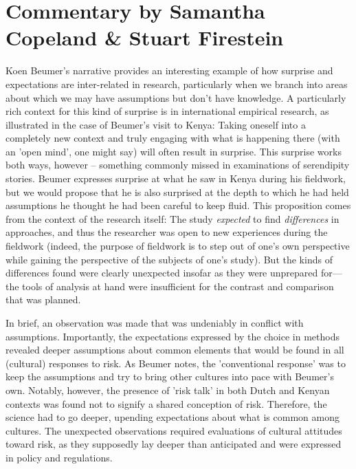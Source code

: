 \documentclass[authordate, empirical]{jote-new-article}
\author[1]{\mbox{Samantha Copeland\orcid{0000-0002-6946-7165}}}
\affil[1]{Delft University of Technology, Delft, the Netherlands}
\author[2]{\mbox{Stuart Firestein\orcid{0000-0003-1774-5853}}}
\affil[2]{Columbia University, New York, the United States}
\begin{document}
\begin{frontmatter}
  \maketitle
  \begin{abstract}
    \printabstracttext
  \end{abstract}
\end{frontmatter}


	\section{Commentary by Samantha Copeland \& Stuart Firestein}





	Koen Beumer's narrative provides an interesting example of how surprise and expectations are inter-related in research, particularly when we branch into areas about which we may have assumptions but don't have knowledge. A particularly rich context for this kind of surprise is in international empirical research, as illustrated in the case of Beumer's visit to Kenya: Taking oneself into a completely new context and truly engaging with what is happening there (with an 'open mind', one might say) will often result in surprise. This surprise works both ways, however -- something commonly missed in examinations of serendipity stories. Beumer expresses surprise at what he saw in Kenya during his fieldwork, but we would propose that he is also surprised at the depth to which he had held assumptions he thought he had been careful to keep fluid. This proposition comes from the context of the research itself: The study \emph{expected} to find \emph{differences} in approaches, and thus the researcher was open to new experiences during the fieldwork (indeed, the purpose of fieldwork is to step out of one's own perspective while gaining the perspective of the subjects of one's study). But the kinds of differences found were clearly unexpected insofar as they were unprepared for—the tools of analysis at hand were insufficient for the contrast and comparison that was planned.

	In brief, an observation was made that was undeniably in conflict with assumptions. Importantly, the expectations expressed by the choice in methods revealed deeper assumptions about common elements that would be found in all (cultural) responses to risk. As Beumer notes, the 'conventional response' was to keep the assumptions and try to bring other cultures into pace with Beumer's own. Notably, however, the presence of 'risk talk' in both Dutch and Kenyan contexts was found not to signify a shared conception of risk. Therefore, the science had to go deeper, upending expectations about what is common among cultures. The unexpected observations required evaluations of cultural attitudes toward risk, as they supposedly lay deeper than anticipated and were expressed in policy and regulations.
\end{document}
